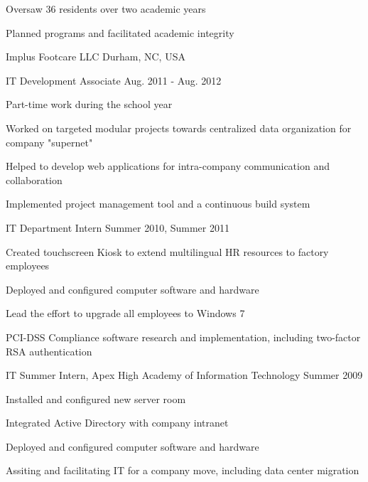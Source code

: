 \begin{cventries}
    {
      \begin{cvitems}
        \item {Oversaw 36 residents over two academic years}
	    \item {Planned programs and facilitated academic integrity}
      \end{cvitems}
    }
  \cvmultientry
    {Implus Footcare LLC}
    {Durham, NC, USA}
    {
      \begin{cvsubentries}
      {
        \cvsubentry
        {IT Development Associate}
        {Aug. 2011 - Aug. 2012}
        {
          \begin{cvitems}
            \item Part-time work during the school year
	    \item Worked on targeted modular projects towards centralized data organization for company "supernet"
	    \item Helped to develop web applications for intra-company communication and collaboration
	    \item Implemented project management tool and a continuous build system
          \end{cvitems} 
        }
      }
      \cvsubentry
      {IT Department Intern}
      {Summer 2010, Summer 2011}
      {
        \begin{cvitems}
          \item Created touchscreen Kiosk to extend multilingual HR resources to factory employees
          \item Deployed and configured computer software and hardware
          \item Lead the effort to upgrade all employees to Windows 7
          \item PCI-DSS Compliance software research and implementation, including two-factor RSA authentication
        \end{cvitems}
      }
      \cvsubentry
      {IT Summer Intern, Apex High Academy of Information Technology}
      {Summer 2009}
      {
        \begin{cvitems}
          \item Installed and configured new server room
	  \item Integrated Active Directory with company intranet
	  \item Deployed and configured computer software and hardware
	  \item Assiting and facilitating IT for a company move, including data center migration
	\end{cvitems}
      }
      \end{cvsubentries}
    }
\end{cventries}
